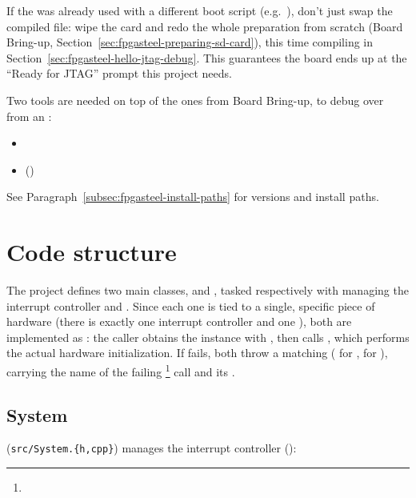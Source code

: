 If the  was already used with a different boot script (e.g.\ ), don't just swap the compiled file: wipe the card and redo the whole  preparation from scratch (Board Bring-up, Section~\ref{sec:fpgasteel-preparing-sd-card}), this time compiling  in Section~\ref{sec:fpgasteel-hello-jtag-debug}. This guarantees the board ends up at the ``Ready for JTAG'' prompt this project needs.

Two tools are needed on top of the ones from Board Bring-up, to debug over  from an :

\begin{itemize}
    \item {}
    \item {} ()
\end{itemize}

See Paragraph~\ref{subsec:fpgasteel-install-paths} for versions and install paths.

\section{Code structure}
\label{sec:fpgasteel-hello-code-structure}

The project defines two main  classes,  and , tasked respectively with managing the interrupt controller and . Since each one is tied to a single, specific piece of hardware (there is exactly one interrupt controller and one ), both are implemented as : the caller obtains the instance with , then calls , which performs the actual hardware initialization. If  fails, both throw a matching  ( for ,  for ), carrying the name of the failing \footnote{} call and its .

\subsection{System}
\label{subsec:fpgasteel-hello-system}

 (\lstinline[style=inlineFsRepo]!src/System.{h,cpp}!) manages the interrupt controller ():

